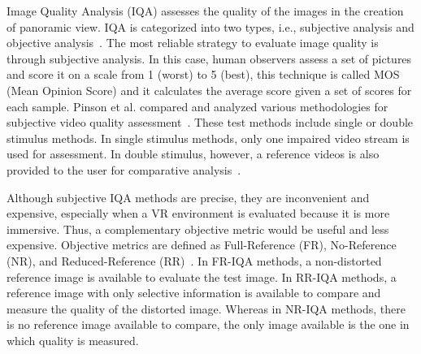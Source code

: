 \documentclass[10pt,conference,pdftex]{IEEEtran}
\begin{document}
Image Quality Analysis (IQA) assesses the quality of the images in the creation of panoramic view. IQA is categorized into two types, i.e., subjective analysis and objective analysis~\cite{wang2006modern}. The most reliable strategy to evaluate image quality is through subjective analysis. In this case, human observers assess a set of pictures and score it on a scale from 1 (worst) to 5 (best), this technique is called MOS (Mean Opinion Score) and it calculates the average score given a set of scores for each sample. Pinson et al. compared and analyzed various methodologies for subjective video quality assessment~\cite{pinson:2003}. These test methods include single or double stimulus methods. In single stimulus methods, only one impaired video stream is used for assessment. In double stimulus, however, a reference videos is also provided to the user for comparative analysis~\cite{pinson:2003}.  \par

Although subjective IQA  methods are precise, they are inconvenient and expensive, especially when a VR environment is evaluated because it is more immersive. Thus, a complementary objective metric would be useful and less expensive. Objective metrics are defined as Full-Reference (FR), No-Reference (NR), and Reduced-Reference (RR)~\cite{li:2019}. In FR-IQA methods, a non-distorted reference image is available to evaluate the test image. In RR-IQA methods, a reference image with only selective information is available to compare and measure the quality of the distorted image. Whereas in NR-IQA methods, there is no reference image available to compare, the only image available is the one in which quality is measured.\par
\end{document}
